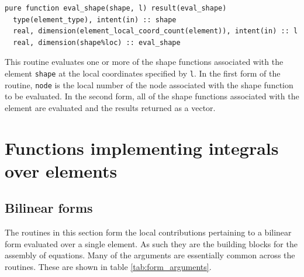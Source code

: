 \documentclass[a4paper, 11pt]{book}
\begin{document}
\begin{lstlisting}
pure function eval_shape(shape, l) result(eval_shape)
  type(element_type), intent(in) :: shape
  real, dimension(element_local_coord_count(element)), intent(in) :: l
  real, dimension(shape%loc) :: eval_shape
\end{lstlisting}

This routine evaluates one or more of the shape functions associated with
the element \lstinline+shape+ at the local coordinates specified by
\lstinline+l+. In the first form of the routine,  \lstinline+node+ is the
local number of the node associated with the shape function to be
evaluated. In the second form, all of the shape functions associated with
the element are evaluated and the results returned as a vector.


\chapter{Functions implementing integrals over elements}

\section{Bilinear forms}

The routines in this section form the local contributions pertaining to a
bilinear form evaluated over a single element. As such they are the building
blocks for the assembly of equations. Many of the arguments are essentially
common across the routines. These are shown in table \ref{tab:form_arguments}.
\end{document}
